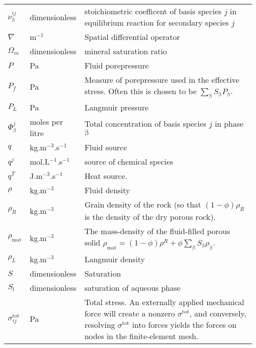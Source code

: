 \documentclass[12pt]{report}
\def\phase{\mathrm{\beta}}
\begin{document}
\begin{longtable}{llp{10cm}}
$\nu^{ij}_{\phase}$ & dimensionless & stoichiometric coefficent of
basis species $j$ in equilibrium reaction for secondary species $j$ \\

$\nabla$ & m$^{-1}$ & Spatial differential operator \\

$\Omega_{m}$ & dimensionless & mineral saturation ratio \\


$P$ & Pa & Fluid porepressure \\

$P_{f}$ & Pa & Measure of porepressure used in the effective stress.
Often this is chosen to be $\sum_{\phase}S_{\phase}P_{\phase}$. \\

$P_{L}$ & Pa & Langmuir pressure \\

$\Phi_{\phase}^{j}$ & moles per litre & Total concentration of basis
species $j$ in phase $\phase$ \\

$q$ & kg.m$^{-3}$.s$^{-1}$ & Fluid source \\

$q^{j}$ & mol.L$^{-1}$.s$^{-1}$ & source of chemical species \\

$q^{T}$ & J.m$^{-3}$.s$^{-1}$ & Heat source. \\

$\rho$ & kg.m$^{-3}$ & Fluid density \\

$\rho_{R}$ & kg.m$^{-3}$ & Grain density of the rock (so that
$(1-\phi)\rho_{R}$ is the density of the dry porous rock). \\

$\rho_{\mathrm{mat}}$ & kg.m$^{-3}$ & The mass-density of the
fluid-filled porous solid $\rho_{\mathrm{mat}} = (1 - \phi)\rho^{R} +
\phi\sum_{\phase}S_{\phase}\rho_{\phase}$. \\

$\rho_{L}$ & kg.m$^{-3}$ & Langmuir density\\

$S$ & dimensionless & Saturation \\

$S_{l}$ & dimensionless & saturation of aqueous phase \\


$\sigma^{\mathrm{tot}}_{ij}$ & Pa & Total stress.  An
externally applied mechanical force will create a nonzero
$\sigma^{\mathrm{tot}}$, and conversely, resolving
$\sigma^{\mathrm{tot}}$ into forces yields the forces on nodes in the
finite-element mesh. \\


\end{longtable}
\end{document}
